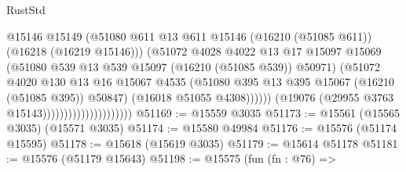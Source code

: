 \begin{lexlean}{RustStd}
\begin{coremodule}
                                                @15146
                                                @15149
                                                (@51080
                                                  @611
                                                  @13
                                                  @611
                                                  @15146
                                                  (@16210 (@51085 @611))
                                                  (@16218 (@16219 @15146)))
                                                (@51072
                                                  @4028
                                                  @4022
                                                  @13
                                                  @17
                                                  @15097
                                                  @15069
                                                  (@51080
                                                    @539
                                                    @13
                                                    @539
                                                    @15097
                                                    (@16210 (@51085 @539))
                                                    @50971)
                                                  (@51072
                                                    @4020
                                                    @130
                                                    @13
                                                    @16
                                                    @15067
                                                    @4535
                                                    (@51080
                                                      @395
                                                      @13
                                                      @395
                                                      @15067
                                                      (@16210 (@51085 @395))
                                                      @50847)
                                                    (@16018 @51055 @4308))))))
                                          (@19076 (@29955 @3763 @15143)))))))))))))))))))))
@51169 := @15559 @3035
@51173 := @15561 (@15565 @3035) (@15571 @3035)
@51174 := @15580 @49984
@51176 := @15576 (@51174 @15595)
@51178 := @15618 (@15619 @3035)
@51179 := @15614 @51178
@51181 := @15576 (@51179 @15643)
@51198 := @15575
    (fun (fn : @76) =>

\end{coremodule}
\end{lexlean}
